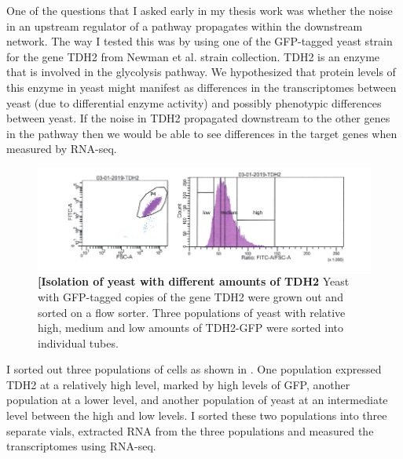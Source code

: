 One of the questions that I asked early in my thesis work was whether the noise in an upstream regulator of a pathway propagates within the downstream network. The way I tested this was by using one of the GFP-tagged yeast strain for the gene TDH2 from Newman et al.\cite{newman2006na} strain collection. TDH2 is an enzyme that is involved in the glycolysis pathway. We hypothesized that protein levels of this enzyme in yeast might manifest as differences in the transcriptomes between yeast (due to differential enzyme activity) and possibly phenotypic differences between yeast. If the noise in TDH2 propagated downstream to the other genes in the pathway then we would be able to see differences in the target genes when measured by RNA-seq. 

\begin{figure}[t!]  
    \centering
    \includegraphics[width=\linewidth]{figures/intro/intro_tdh2_facs.png}
    \caption[Isolation of yeast with different amounts of TDH2]{%
        \textbf{[Isolation of yeast with different amounts of TDH2}
        Yeast with GFP-tagged copies of the gene TDH2 were grown out and sorted on a flow sorter. Three populations of yeast with relative high, medium and low amounts of TDH2-GFP were sorted into individual tubes.
    }
    \label{fig:intro3}
\end{figure}

I sorted out three populations of cells as shown in . One population expressed TDH2 at a relatively high level, marked by high levels of GFP, another population at a lower level, and another population of yeast at an intermediate level between the high and low levels.  I sorted these two populations into three separate vials, extracted RNA from the three populations and measured the transcriptomes using RNA-seq.

